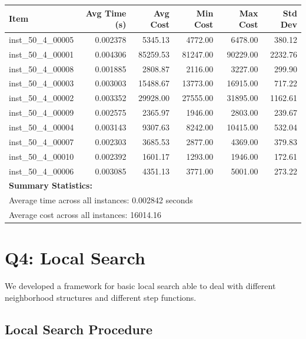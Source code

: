 \documentclass{article}
\begin{document}
\begin{table}[H]
    \centering
    \hspace*{-1.5cm}
    \begin{tabular}{lrrrrr}
        \toprule
        \textbf{Item} & \textbf{Avg Time (s)} & \textbf{Avg Cost} & \textbf{Min Cost} & \textbf{Max Cost} & \textbf{Std Dev} \\
        \midrule
        inst\_50\_4\_00005 & 0.002378 & 5345.13 & 4772.00 & 6478.00 & 380.12 \\
        inst\_50\_4\_00001 & 0.004306 & 85259.53 & 81247.00 & 90229.00 & 2232.76 \\
        inst\_50\_4\_00008 & 0.001885 & 2808.87 & 2116.00 & 3227.00 & 299.90 \\
        inst\_50\_4\_00003 & 0.003003 & 15488.67 & 13773.00 & 16915.00 & 717.22 \\
        inst\_50\_4\_00002 & 0.003352 & 29928.00 & 27555.00 & 31895.00 & 1162.61 \\
        inst\_50\_4\_00009 & 0.002575 & 2365.97 & 1946.00 & 2803.00 & 239.67 \\
        inst\_50\_4\_00004 & 0.003143 & 9307.63 & 8242.00 & 10415.00 & 532.04 \\
        inst\_50\_4\_00007 & 0.002303 & 3685.53 & 2877.00 & 4369.00 & 379.83 \\
        inst\_50\_4\_00010 & 0.002392 & 1601.17 & 1293.00 & 1946.00 & 172.61 \\
        inst\_50\_4\_00006 & 0.003085 & 4351.13 & 3771.00 & 5001.00 & 273.22 \\
        \midrule
        \multicolumn{6}{l}{\textbf{Summary Statistics:}} \\
        \multicolumn{6}{l}{Average time across all instances: 0.002842 seconds} \\
        \multicolumn{6}{l}{Average cost across all instances: 16014.16} \\
        \bottomrule
    \end{tabular}
\end{table}

\section*{Q4: Local Search}
We developed a framework for basic local search able to deal with different neighborhood structures and different step functions.

\subsection*{Local Search Procedure}
\end{document}
